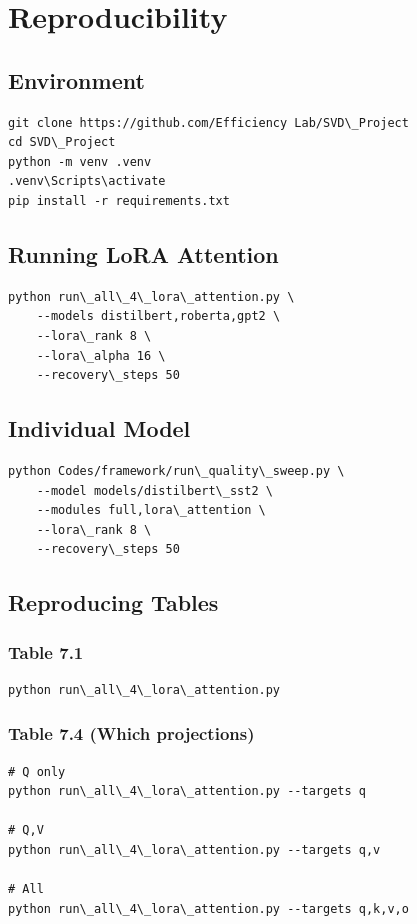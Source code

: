 \section{Reproducibility}

\subsection{Environment}

\begin{lstlisting}
git clone https://github.com/Efficiency Lab/SVD\_Project
cd SVD\_Project
python -m venv .venv
.venv\Scripts\activate
pip install -r requirements.txt
\end{lstlisting}

\subsection{Running LoRA Attention}

\begin{lstlisting}
python run\_all\_4\_lora\_attention.py \
    --models distilbert,roberta,gpt2 \
    --lora\_rank 8 \
    --lora\_alpha 16 \
    --recovery\_steps 50
\end{lstlisting}

\subsection{Individual Model}

\begin{lstlisting}
python Codes/framework/run\_quality\_sweep.py \
    --model models/distilbert\_sst2 \
    --modules full,lora\_attention \
    --lora\_rank 8 \
    --recovery\_steps 50
\end{lstlisting}

\subsection{Reproducing Tables}

\subsubsection{Table 7.1}
\begin{lstlisting}
python run\_all\_4\_lora\_attention.py
\end{lstlisting}

\subsubsection{Table 7.4 (Which projections)}
\begin{lstlisting}
# Q only
python run\_all\_4\_lora\_attention.py --targets q

# Q,V
python run\_all\_4\_lora\_attention.py --targets q,v

# All
python run\_all\_4\_lora\_attention.py --targets q,k,v,o
\end{lstlisting}

